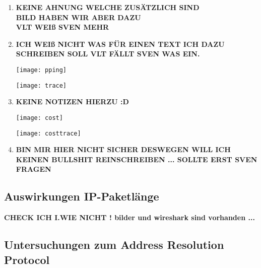 \documentclass{scrartcl}
\begin{document}
\begin{enumerate}
    \item
    \textbf{KEINE AHNUNG WELCHE ZUSÄTZLICH SIND\\
     BILD HABEN WIR ABER DAZU \\
     VLT WEIß SVEN MEHR}
    
    \item
    \textbf{ICH WEIß NICHT WAS FÜR EINEN TEXT ICH DAZU SCHREIBEN SOLL VLT FÄLLT SVEN WAS EIN.}
    
   \texttt{[image: pping]}
   \label{fig:pping}

   \texttt{[image: trace]}
   \label{fig:trace}
  
    \item
    \textbf{KEINE NOTIZEN HIERZU :D}

   \texttt{[image: cost]}
   \label{fig:cost}

   \texttt{[image: costtrace]}
   \label{fig:costtrace}

    
    \item
    \textbf{BIN MIR HIER NICHT SICHER DESWEGEN WILL ICH KEINEN BULLSHIT REINSCHREIBEN ... SOLLTE ERST SVEN FRAGEN}

    \end{enumerate}

  \subsection[Aufgabe 7 Auswirkungen IP-Paketlänge]{Auswirkungen IP-Paketlänge}
  
  \textbf{CHECK ICH I.WIE NICHT ! bilder und wireshark sind vorhanden ...}
  
  
  \subsection[Aufgabe 8 Untersuchungen zum Adress Resolution Protocol]{Untersuchungen zum Address Resolution Protocol}
  
\end{document}
